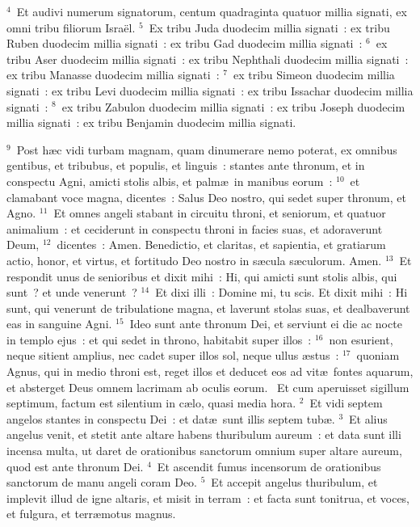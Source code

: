 ${}^{4}$~Et audivi numerum signatorum, centum quadraginta quatuor millia signati, ex omni tribu filiorum Isra\"el.
${}^{5}$~Ex tribu Juda duodecim millia signati~: ex tribu Ruben duodecim millia signati~: ex tribu Gad duodecim millia signati~:
${}^{6}$~ex tribu Aser duodecim millia signati~: ex tribu Nephthali duodecim millia signati~: ex tribu Manasse duodecim millia signati~:
${}^{7}$~ex tribu Simeon duodecim millia signati~: ex tribu Levi duodecim millia signati~: ex tribu Issachar duodecim millia signati~:
${}^{8}$~ex tribu Zabulon duodecim millia signati~: ex tribu Joseph duodecim millia signati~: ex tribu Benjamin duodecim millia signati.


${}^{9}$~Post h\ae c vidi turbam magnam, quam dinumerare nemo poterat, ex omnibus gentibus, et tribubus, et populis, et linguis~: stantes ante thronum, et in conspectu Agni, amicti stolis albis, et palm\ae\ in manibus eorum~:
${}^{10}$~et clamabant voce magna, dicentes~: Salus Deo nostro, qui sedet super thronum, et Agno.
${}^{11}$~Et omnes angeli stabant in circuitu throni, et seniorum, et quatuor animalium~: et ceciderunt in conspectu throni in facies suas, et adoraverunt Deum,
${}^{12}$~dicentes~: Amen. Benedictio, et claritas, et sapientia, et gratiarum actio, honor, et virtus, et fortitudo Deo nostro in s\ae cula s\ae culorum. Amen.
${}^{13}$~Et respondit unus de senioribus et dixit mihi~: Hi, qui amicti sunt stolis albis, qui sunt~? et unde venerunt~?
${}^{14}$~Et dixi illi~: Domine mi, tu scis. Et dixit mihi~: Hi sunt, qui venerunt de tribulatione magna, et laverunt stolas suas, et dealbaverunt eas in sanguine Agni.
${}^{15}$~Ideo sunt ante thronum Dei, et serviunt ei die ac nocte in templo ejus~: et qui sedet in throno, habitabit super illos~:
${}^{16}$~non esurient, neque sitient amplius, nec cadet super illos sol, neque ullus \ae stus~:
${}^{17}$~quoniam Agnus, qui in medio throni est, reget illos et deducet eos ad vit\ae\ fontes aquarum, et absterget Deus omnem lacrimam ab oculis eorum.
~\lettrine[lines=10,image=true,loversize=0.05,lraise=-0.03]{E}{}t cum aperuisset sigillum septimum, factum est silentium in c\ae lo, quasi media hora.
${}^{2}$~Et vidi septem angelos stantes in conspectu Dei~: et dat\ae\ sunt illis septem tub\ae .
${}^{3}$~Et alius angelus venit, et stetit ante altare habens thuribulum aureum~: et data sunt illi incensa multa, ut daret de orationibus sanctorum omnium super altare aureum, quod est ante thronum Dei.
${}^{4}$~Et ascendit fumus incensorum de orationibus sanctorum de manu angeli coram Deo.
${}^{5}$~Et accepit angelus thuribulum, et implevit illud de igne altaris, et misit in terram~: et facta sunt tonitrua, et voces, et fulgura, et terr\ae motus magnus.
